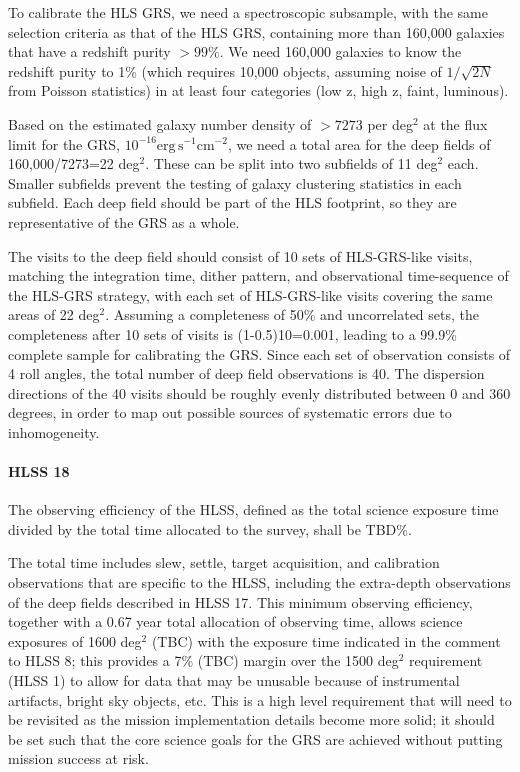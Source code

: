 To calibrate the HLS GRS, we need a spectroscopic subsample, with the same selection criteria as that of the HLS GRS, containing more than 160,000 galaxies  that have a redshift purity $>99\%$. We need 160,000 galaxies to know the redshift purity to 1\% (which requires 10,000 objects, assuming noise of $1/\sqrt{2N}$ from Poisson statistics) in at least four categories (low z, high z, faint, luminous).

Based on the estimated galaxy number density of $>7273$ per deg$^2$ at the flux limit for the GRS, $10^{-16} \mathrm{erg} \, \mathrm{s}^{-1}\mathrm{cm}^{-2}$, we need a total area for the deep fields of 160,000/7273=22 deg$^2$.  These can be split into two subfields of 11 deg$^2$ each.  Smaller subfields prevent the testing of galaxy clustering statistics in each subfield. Each deep field should be part of the HLS footprint, so they are representative of the GRS as a whole.

 The visits to the deep field should consist of 10 sets of HLS-GRS-like visits,
 matching the integration time, dither pattern, and observational time-sequence
 of the HLS-GRS strategy, with each set of HLS-GRS-like visits covering the same
 areas of 22 deg$^2$. Assuming a completeness of 50\% and uncorrelated sets, the
 completeness after 10 sets of visits is (1-0.5)10=0.001, leading to a 99.9\%
 complete sample for calibrating the GRS. Since each set of observation consists
 of 4 roll angles, the total number of deep field observations is 40. The
 dispersion directions of the 40 visits should be roughly evenly distributed
 between 0 and 360 degrees, in order to map out possible sources of systematic
 errors due to inhomogeneity.

\paragraph{HLSS 18} The observing efficiency of the HLSS, defined as the total science exposure time divided by the total time allocated to the survey, shall be TBD\%.

 The total time includes slew, settle, target acquisition, and
 calibration observations that are specific to the HLSS, including the
 extra-depth observations of the deep fields described in HLSS 17.  This minimum
 observing efficiency, together with a 0.67 year total allocation of observing
 time, allows science exposures of 1600 deg$^2$ (TBC) with the exposure time
 indicated in the comment to HLSS 8; this provides a 7\% (TBC) margin over the
 1500 deg$^2$ requirement (HLSS 1) to allow for data that may be unusable because of instrumental artifacts, bright sky objects, etc. This is a high level
 requirement that will need to be revisited as the mission implementation details
 become more solid; it should be set such that the core science goals for the GRS
 are achieved without putting mission success at risk.

